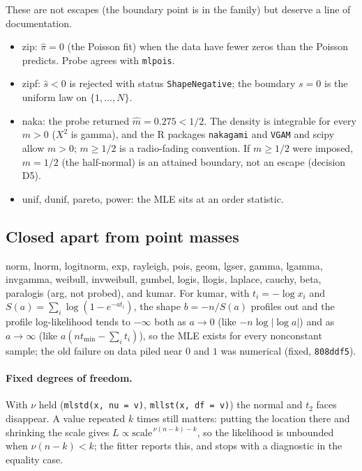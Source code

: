 \documentclass[11pt]{article}
\newcommand{\code}[1]{\texttt{#1}}
\theoremstyle{plain}
\theoremstyle{definition}
\theoremstyle{remark}
\begin{document}
These are not escapes (the boundary point is in the family) but deserve a
line of documentation.
\begin{itemize}
  \item zip: $\hat\pi = 0$ (the Poisson fit) when the data have fewer zeros
    than the Poisson predicts. Probe agrees with \code{mlpois}.
  \item zipf: $\hat s < 0$ is rejected with status \code{ShapeNegative};
    the boundary $s = 0$ is the uniform law on $\{1,\dots,N\}$.
  \item naka: the probe returned $\hat m = 0.275 < 1/2$. The density is
    integrable for every $m > 0$ ($X^2$ is gamma), and the R packages
    \code{nakagami} and \code{VGAM} and scipy allow $m > 0$; $m \ge 1/2$ is
    a radio-fading convention. If $m \ge 1/2$ were imposed, $m = 1/2$ (the
    half-normal) is an attained boundary, not an escape (decision D5).
  \item unif, dunif, pareto, power: the MLE sits at an order statistic.
\end{itemize}

\subsection{Closed apart from point masses}

norm, lnorm, logitnorm, exp, rayleigh, pois, geom, lgser, gamma, lgamma,
invgamma, weibull, invweibull, gumbel, logis, llogis, laplace, cauchy, beta,
paralogis (arg, not probed), and kumar. For kumar, with $t_i = -\log x_i$ and
$S(a) = \sum_i \log(1 - e^{-a t_i})$, the shape $b = -n/S(a)$ profiles out
and the profile log-likelihood tends to $-\infty$ both as $a\to0$ (like
$-n\log\lvert\log a\rvert$) and as $a\to\infty$ (like
$a(n t_{\min} - \sum_i t_i)$), so the MLE exists for every nonconstant
sample; the old failure on data piled near $0$ and $1$ was numerical
(fixed, \code{808ddf5}).

\paragraph{Fixed degrees of freedom.} With $\nu$ held (\code{mlstd(x, nu =
v)}, \code{mllst(x, df = v)}) the normal and $t_2$ faces disappear. A value
repeated $k$ times still matters: putting the location there and shrinking
the scale gives $L \propto \text{scale}^{\,\nu(n-k)-k}$, so the likelihood is
unbounded when $\nu(n-k) < k$; the fitter reports this, and stops with a
diagnostic in the equality case.
\end{document}
